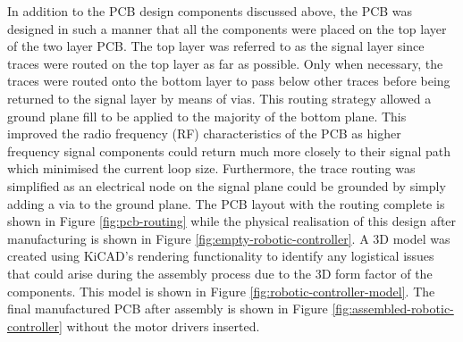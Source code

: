 In addition to the PCB design components discussed above, the PCB was designed in such a manner that all the components were placed on the top layer of the two layer PCB. The top layer was referred to as the signal layer since traces were routed on the top layer as far as possible. Only when necessary, the traces were routed onto the bottom layer to pass below other traces before being returned to the signal layer by means of vias. This routing strategy allowed a ground plane fill to be applied to the majority of the bottom plane. This improved the radio frequency (RF) characteristics of the PCB as higher frequency signal components could return much more closely to their signal path which minimised the current loop size. Furthermore, the trace routing was simplified as an electrical node on the signal plane could be grounded by simply adding a via to the ground plane. The PCB layout with the routing complete is shown in Figure \ref{fig:pcb-routing} while the physical realisation of this design after manufacturing is shown in Figure \ref{fig:empty-robotic-controller}. A 3D model was created using KiCAD's rendering functionality to identify any logistical issues that could arise during the assembly process due to the 3D form factor of the components. This model is shown in Figure \ref{fig:robotic-controller-model}. The final manufactured PCB after assembly is shown in Figure \ref{fig:assembled-robotic-controller} without the motor drivers inserted.

